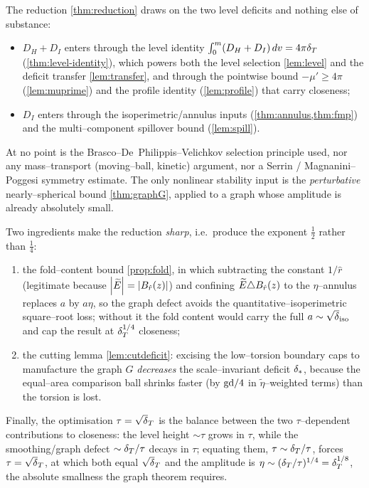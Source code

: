 \begin{remark}
\label{rem:audit}
The reduction \cref{thm:reduction} draws on the two level deficits and
nothing else of substance:
\begin{itemize}[leftmargin=1.5em]
\item $D_H+D_I$ enters through the level identity
   $\int_0^m(D_H+D_I)\,dv=4\pi\delta_T$ (\cref{thm:level-identity}), which powers
   both the level selection \cref{lem:level} and the deficit transfer
   \cref{lem:transfer}, and through the pointwise bound $-\mu'\ge4\pi$
   (\cref{lem:muprime}) and the profile identity (\cref{lem:profile}) that
   carry closeness;
\item $D_I$ enters through the isoperimetric/annulus inputs
   (\cref{thm:annulus,thm:fmp}) and the multi--component spillover bound
   (\cref{lem:spill}).
\end{itemize}
At no point is the Brasco--De~Philippis--Velichkov selection principle used,
nor any mass--transport (moving--ball, kinetic) argument, nor a Serrin /
Magnanini--Poggesi symmetry estimate. The only nonlinear stability input is
the \emph{perturbative} nearly--spherical bound \cref{thm:graphG}, applied to
a graph whose amplitude is already absolutely small.

Two ingredients make the reduction \emph{sharp}, i.e.\ produce the exponent
$\tfrac12$ rather than $\tfrac14$:
\begin{enumerate}[label=\textup{(\alph*)},leftmargin=1.8em]
\item the fold--content bound \cref{prop:fold}, in which subtracting the
   constant $1/\hat r$ (legitimate because $\left\lvert\widetilde{E}\right\rvert=\left\lvert B_{\hat r}(z)\right\rvert$)
   and confining $\widetilde{E}\triangle B_{\hat r}(z)$ to the $\eta$--annulus
   replaces $a$ by $a\eta$, so the graph defect avoids the
   quantitative--isoperimetric square--root loss; without it the fold content
   would carry the full $a\sim\sqrt\diso$ and cap the result at
   $\delta_T^{1/4}$ closeness;
\item the cutting lemma \cref{lem:cutdeficit}: excising the low--torsion
   boundary caps to manufacture the graph $G$ \emph{decreases} the
   scale--invariant deficit $\delta_{*}$, because the equal--area comparison ball
   shrinks faster (by $\mathrm{gd}/4$ in $\tilde\eta$--weighted terms) than the
   torsion is lost.
\end{enumerate}
Finally, the optimisation $\tau=\sqrt\dT$ is the balance between the two
$\tau$--dependent contributions to closeness: the level height $\sim\tau$
grows in $\tau$, while the smoothing/graph defect $\sim\delta_T/\tau$ decays in
$\tau$; equating them, $\tau\sim\delta_T/\tau$, forces $\tau=\sqrt\dT$, at which
both equal $\sqrt\dT$ and the amplitude is $\eta\sim(\delta_T/\tau)^{1/4}=
\delta_T^{1/8}$, the absolute smallness the graph theorem requires.
\end{remark}
